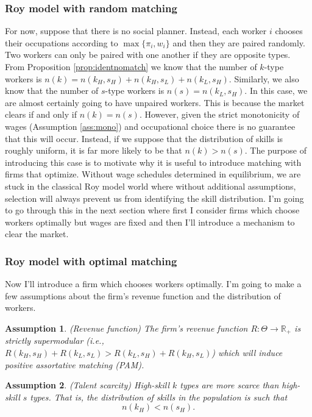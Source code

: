 \documentclass[12 pt]{article}
\newtheorem{assumption}{Assumption} %
\begin{document}
\subsubsection{Roy model with random matching}

For now, suppose that there is no social planner. Instead, each worker $i$ chooses their occupations according to $\max\{\pi_i,w_i\}$ and then they are paired randomly. Two workers can only be paired with one another if they are opposite types. From Proposition \ref{prop:identnomatch} we know that the number of $k$-type workers is $n(k) = n(k_H,s_H) + n(k_H,s_L) + n(k_L,s_H)$. Similarly, we also know that the number of $s$-type workers is $n(s)=n(k_L,s_H)$. In this case, we are almost certainly going to have unpaired workers. This is because the market clears if and only if $n(k) = n(s)$. However, given the strict monotonicity of wages (Assumption \ref{ass:mono}) and occupational choice there is no guarantee that this will occur. Instead, if we suppose that the distribution of skills is roughly uniform, it is far more likely to be that $n(k)>n(s)$. The purpose of introducing this case is to motivate why it is useful to introduce matching with firms that optimize. Without wage schedules determined in equilibrium, we are stuck in the classical Roy model world where without additional assumptions, selection will always prevent us from identifying the skill distribution. I'm going to go through this in the next section where first I consider firms which choose workers optimally but wages are fixed and then I'll introduce a mechanism to clear the market.

\subsubsection{Roy model with optimal matching}

Now I'll introduce a firm which chooses workers optimally. I'm going to make a few assumptions about the firm's revenue function and the distribution of workers.

\begin{assumption}(Revenue function)
	The firm's revenue function $R:\Theta\to\mathbb{R}_+$ is strictly supermodular (i.e., $R(k_H,s_H) + R(k_L,s_L) > R(k_L,s_H) + R(k_H,s_L)$) which will induce positive assortative matching (PAM). 
	\label{ass:rev}
\end{assumption}

\begin{assumption}
	(Talent scarcity) High-skill $k$ types are more scarce than high-skill $s$ types.  That is, the distribution of skills in the population is such that
	\begin{equation*}
		n(k_H) < n(s_H).
	\end{equation*}
	\label{ass:scarcity}
\end{assumption}
\end{document}
